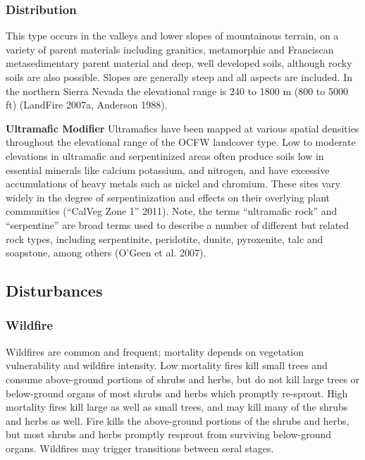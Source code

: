 \subsubsection{Distribution}
This type occurs in the valleys and lower slopes of mountainous terrain, on a variety of parent materials including granitics, metamorphic and Franciscan metasedimentary parent material and deep, well developed soils, although rocky soils are also possible. Slopes are generally steep and all aspects are included. In the northern Sierra Nevada the elevational range is 240 to 1800 m (800 to 5000 ft) (LandFire 2007a, Anderson 1988).

\begin{adjustwidth}{2cm}{}

\textbf{Ultramafic Modifier} Ultramafics have been mapped at various spatial densities throughout the elevational range of the OCFW landcover type. Low to moderate elevations in ultramafic and serpentinized areas often produce soils low in essential minerals like calcium potassium, and nitrogen, and have excessive accumulations of heavy metals such as nickel and chromium. These sites vary widely in the degree of serpentinization and effects on their overlying plant communities (``CalVeg Zone 1'' 2011). Note, the terms ``ultramafic rock'' and ``serpentine'' are broad terms used to describe a number of different but related rock types, including serpentinite, peridotite, dunite, pyroxenite, talc and soapstone, among others (O'Geen et al. 2007).


\end{adjustwidth}

\subsection*{Disturbances}

\subsubsection{Wildfire}
Wildfires are common and frequent; mortality depends on vegetation vulnerability and wildfire intensity. Low mortality fires kill small trees and consume above-ground portions of shrubs and herbs, but do not kill large trees or below-ground organs of most shrubs and herbs which promptly re-sprout. High mortality fires kill large as well as small trees, and may kill many of the shrubs and herbs as well. Fire kills the above-ground portions of the shrubs and herbs, but most shrubs and herbs promptly resprout from surviving below-ground organs. Wildfires may trigger transitions between seral stages.

